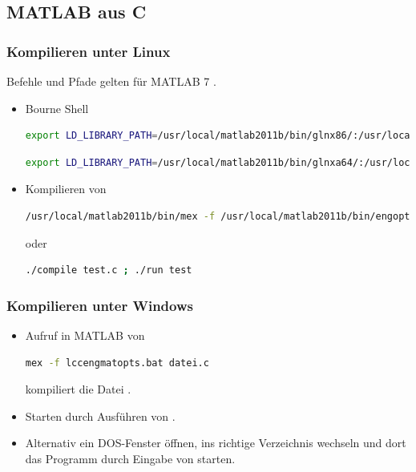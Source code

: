 \documentclass[hyperref={xetex}]{beamer}
\begin{document}
\subsection{MATLAB aus C}
%
%
\begin{frame}[fragile]\frametitle{Kompilieren unter Linux}

Befehle und Pfade gelten f\"ur MATLAB 7 .

\begin{itemize}
\item Bourne Shell
\begin{lstlisting}[language=bash]
export LD_LIBRARY_PATH=/usr/local/matlab2011b/bin/glnx86/:/usr/local/matlab2011b/sys/os/glnx86:$LD_LIBRARY_PATH
\end{lstlisting} %
\begin{lstlisting}[language=bash]
export LD_LIBRARY_PATH=/usr/local/matlab2011b/bin/glnxa64/:/usr/local/matlab2011b/sys/os/glnxa64:$LD_LIBRARY_PATH
\end{lstlisting} %


\item Kompilieren von 
\begin{lstlisting}[language=bash]
/usr/local/matlab2011b/bin/mex -f /usr/local/matlab2011b/bin/engopts.sh test.c
\end{lstlisting}
oder
\begin{lstlisting}[language=bash]
./compile test.c ; ./run test
\end{lstlisting}

\end{itemize}
\end{frame}
% 
% 
\begin{frame}[fragile]\frametitle{Kompilieren unter Windows}
\begin{itemize}
\item Aufruf in MATLAB von
\begin{lstlisting}[language=bash]
mex -f lccengmatopts.bat datei.c
\end{lstlisting}
kompiliert die Datei .
\item Starten durch Ausf\"uhren von .
\item Alternativ ein DOS-Fenster \"offnen, ins richtige Verzeichnis wechseln  
 und dort das Programm durch Eingabe von  starten.
\end{itemize}
\end{frame}
\end{document}
